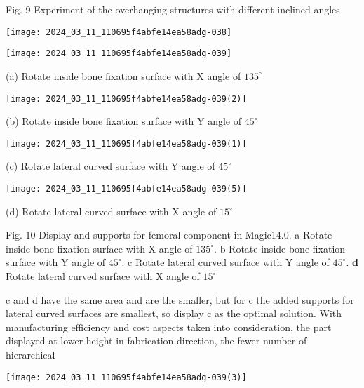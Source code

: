 \documentclass[10pt]{article}
\begin{document}
Fig. 9 Experiment of the overhanging structures with different inclined angles

\begin{center}
\texttt{[image: 2024\_03\_11\_110695f4abfe14ea58adg-038]}
\end{center}

\begin{center}
\texttt{[image: 2024\_03\_11\_110695f4abfe14ea58adg-039]}
\end{center}

(a) Rotate inside bone fixation surface with $\mathrm{X}$ angle of $135^{\circ}$

\begin{center}
\texttt{[image: 2024\_03\_11\_110695f4abfe14ea58adg-039(2)]}
\end{center}

(b) Rotate inside bone fixation surface with $\mathrm{Y}$ angle of $45^{\circ}$

\begin{center}
\texttt{[image: 2024\_03\_11\_110695f4abfe14ea58adg-039(1)]}
\end{center}

(c) Rotate lateral curved surface with $\mathrm{Y}$ angle of $45^{\circ}$

\begin{center}
\texttt{[image: 2024\_03\_11\_110695f4abfe14ea58adg-039(5)]}
\end{center}

(d) Rotate lateral curved surface with $\mathrm{X}$ angle of $15^{\circ}$

Fig. 10 Display and supports for femoral component in Magic14.0. a Rotate inside bone fixation surface with $\mathrm{X}$ angle of $135^{\circ}$. b Rotate inside bone fixation surface with $\mathrm{Y}$ angle of $45^{\circ}$. c Rotate lateral curved surface with $\mathrm{Y}$ angle of $45^{\circ}$. $\mathbf{d}$ Rotate lateral curved surface with $\mathrm{X}$ angle of $15^{\circ}$

c and d have the same area and are the smaller, but for c the added supports for lateral curved surfaces are smallest, so display $\mathrm{c}$ as the optimal solution. With manufacturing efficiency and cost aspects taken into consideration, the part displayed at lower height in fabrication direction, the fewer number of hierarchical

\begin{center}
\texttt{[image: 2024\_03\_11\_110695f4abfe14ea58adg-039(3)]}
\end{center}
\end{document}
